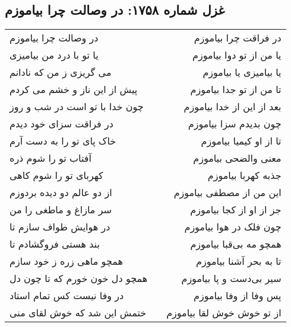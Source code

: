 \begin{center}
\section*{غزل شماره ۱۷۵۸: در وصالت چرا بیاموزم}
\label{sec:1758}
\begin{longtable}{l p{0.5cm} r}
در وصالت چرا بیاموزم
&&
در فراقت چرا بیاموزم
\\
یا تو با درد من بیامیزی
&&
یا من از تو دوا بیاموزم
\\
می گریزی ز من که نادانم
&&
یا بیامیزی یا بیاموزم
\\
پیش از این ناز و خشم می کردم
&&
تا من از تو جدا بیاموزم
\\
چون خدا با تو است در شب و روز
&&
بعد از این از خدا بیاموزم
\\
در فراقت سزای خود دیدم
&&
چون بدیدم سزا بیاموزم
\\
خاک پای تو را به دست آرم
&&
تا از او کیمیا بیاموزم
\\
آفتاب تو را شوم ذره
&&
معنی والضحی بیاموزم
\\
کهربای تو را شوم کاهی
&&
جذبه کهربا بیاموزم
\\
از دو عالم دو دیده بردوزم
&&
این من از مصطفی بیاموزم
\\
سر مازاغ و ماطغی را من
&&
جز از او از کجا بیاموزم
\\
در هوایش طواف سازم تا
&&
چون فلک در هوا بیاموزم
\\
بند هستی فروگشادم تا
&&
همچو مه بی‌قبا بیاموزم
\\
همچو ماهی زره ز خود سازم
&&
تا به بحر آشنا بیاموزم
\\
همچو دل خون خورم که تا چون دل
&&
سیر بی‌دست و پا بیاموزم
\\
در وفا نیست کس تمام استاد
&&
پس وفا از وفا بیاموزم
\\
ختمش این شد که خوش لقای منی
&&
از تو خوش خوش لقا بیاموزم
\\
\end{longtable}
\end{center}
